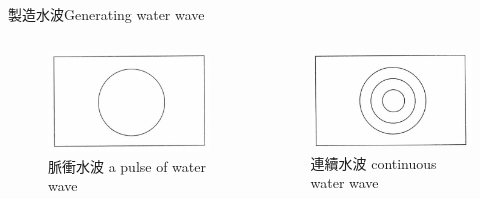 \documentclass[beamer=true]{standalone}
\begin{document}
\begin{frame}{製造水波Generating water wave}
    \begin{columns}
        \begin{figure}
            \centering
            \includegraphics[width=0.97\linewidth]{images/Screenshot 2023-09-25 at 2.30.30 AM.png}
            \caption{脈衝水波 a pulse of water wave}

        \end{figure}
        \begin{figure}
            \centering
            \includegraphics[width=1\linewidth]{images/Screenshot 2023-09-25 at 2.31.45 AM.png}
            \caption{連續水波 continuous water wave}

        \end{figure}
    \end{columns}
\end{frame}
\end{document}
